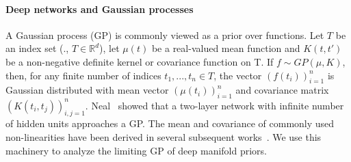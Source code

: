 \paragraph*{Deep networks and Gaussian processes} A Gaussian process (GP) is
commonly viewed as a prior over functions. Let $T$ be an index set
(\eg., $T \in \mathbb{R}^d$), let $\mu(t)$ be a real-valued mean
function and $K(t,t')$ be a non-negative definite kernel or covariance
function on T. If $f \sim GP (\mu, K )$,
then, for any finite number of indices $t_1,...,t_n \in T$, the
vector $(f (t_i))^n_{i=1}$ is Gaussian distributed with mean vector $(\mu(t_i ))^n_{i=1}$ and covariance matrix $(K (t_i , t_j))^n_{i,j=1}$. 
 Neal~\cite{Neal} showed that a two-layer network with infinite number of
 hidden units approaches a GP.
 The mean and covariance of commonly used non-linearities have been
 derived in  several subsequent works~\cite{williams1997computing,cho2009kernel}. We use this
 machinery to analyze the limiting GP of deep manifold priors.
